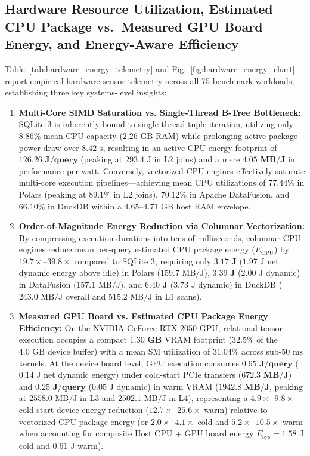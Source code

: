 \documentclass[10pt,a4paper]{article}
\begin{document}
\subsection{Hardware Resource Utilization, Estimated CPU Package vs.\ Measured GPU Board Energy, and Energy-Aware Efficiency}
Table~\ref{tab:hardware_energy_telemetry} and Fig.~\ref{fig:hardware_energy_chart} report empirical hardware sensor telemetry across all 75 benchmark workloads, establishing three key systems-level insights:
\begin{enumerate}[leftmargin=1.5em,itemsep=2pt]
    \item \textbf{Multi-Core SIMD Saturation vs. Single-Thread B-Tree Bottleneck:} SQLite 3 is inherently bound to single-thread tuple iteration, utilizing only $8.86\%$ mean CPU capacity ($2.26\text{ GB}$ RAM) while prolonging active package power draw over $8.42\text{ s}$, resulting in an active CPU energy footprint of $\mathbf{126.26\text{ J/query}}$ (peaking at $293.4\text{ J}$ in L2 joins) and a mere $\mathbf{4.05\text{ MB/J}}$ in performance per watt. Conversely, vectorized CPU engines effectively saturate multi-core execution pipelines---achieving mean CPU utilizations of $\mathbf{77.44\%}$ in Polars (peaking at $89.1\%$ in L2 joins), $\mathbf{70.12\%}$ in Apache DataFusion, and $\mathbf{66.10\%}$ in DuckDB within a $4.65\text{--}4.71\text{ GB}$ host RAM envelope.
    \item \textbf{Order-of-Magnitude Energy Reduction via Columnar Vectorization:} By compressing execution durations into tens of milliseconds, columnar CPU engines reduce mean per-query estimated CPU package energy ($E_{\text{CPU}}$) by $19.7\times\text{--}39.8\times$ compared to SQLite 3, requiring only $\mathbf{3.17\text{ J}}$ ($1.97\text{ J}$ net dynamic energy above idle) in Polars ($159.7\text{ MB/J}$), $\mathbf{3.39\text{ J}}$ ($2.00\text{ J}$ dynamic) in DataFusion ($157.1\text{ MB/J}$), and $\mathbf{6.40\text{ J}}$ ($3.73\text{ J}$ dynamic) in DuckDB ($243.0\text{ MB/J}$ overall and $515.2\text{ MB/J}$ in L1 scans).
    \item \textbf{Measured GPU Board vs. Estimated CPU Package Energy Efficiency:} On the NVIDIA GeForce RTX 2050 GPU, relational tensor execution occupies a compact $\mathbf{1.30\text{ GB}}$ VRAM footprint ($32.5\%$ of the $4.0\text{ GB}$ device buffer) with a mean SM utilization of $\mathbf{31.04\%}$ across sub-$50\text{ ms}$ kernels. At the device board level, GPU execution consumes $\mathbf{0.65\text{ J/query}}$ ($0.14\text{ J}$ net dynamic energy) under cold-start PCIe transfers ($\mathbf{672.3\text{ MB/J}}$) and $\mathbf{0.25\text{ J/query}}$ ($0.05\text{ J}$ dynamic) in warm VRAM ($\mathbf{1942.8\text{ MB/J}}$, peaking at $2558.0\text{ MB/J}$ in L3 and $2502.1\text{ MB/J}$ in L4), representing a $\mathbf{4.9\times\text{--}9.8\times}$ cold-start device energy reduction ($12.7\times\text{--}25.6\times$ warm) relative to vectorized CPU package energy (or $2.0\times\text{--}4.1\times$ cold and $5.2\times\text{--}10.5\times$ warm when accounting for composite Host CPU + GPU board energy $E_{\text{sys}} = 1.58\text{ J}$ cold and $0.61\text{ J}$ warm).
\end{enumerate}
\end{document}
